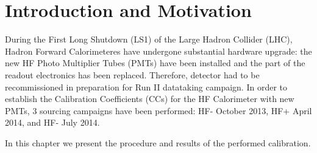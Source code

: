 \section{Introduction and Motivation}
During the First Long Shutdown (LS1) of the Large Hadron Collider (LHC), Hadron Forward Calorimeteres have undergone substantial hardware upgrade: the
new HF Photo Multiplier Tubes (PMTs) have been installed and the part of the readout electronics has been replaced. Therefore, detector had to be recommissioned in preparation for Run II datataking campaign. In order to establish the Calibration Coefficients (CCs) for the HF Calorimeter with new PMTs, 3 sourcing campaigns have been performed: HF- October 2013, HF+ April 2014, and HF- July 2014.

In this chapter we present the procedure and results of the performed calibration.

